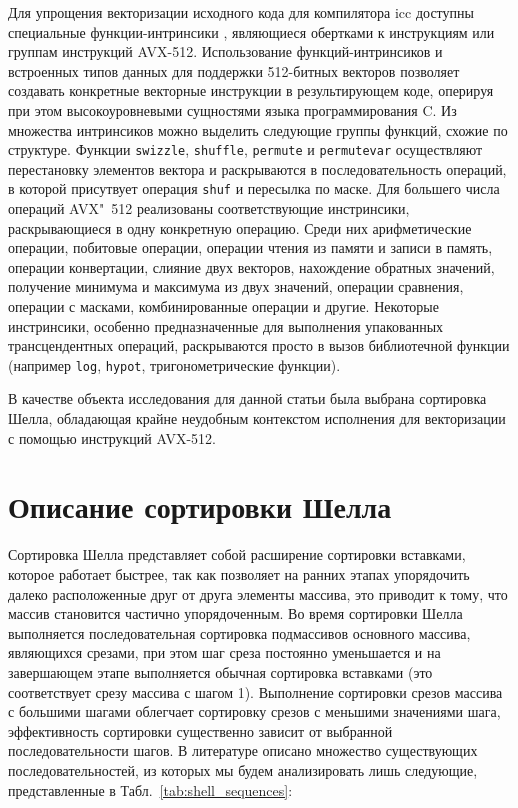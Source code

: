 \documentclass[utf8]{psta}
\begin{document}
Для упрощения векторизации исходного кода для компилятора icc доступны специальные функции-интринсики \cite{compiler_guide, intrinsic_guide}, являющиеся обертками к инструкциям или группам инструкций AVX-512. 
Использование функций-интринсиков и встроенных типов данных для поддержки 512-битных векторов позволяет создавать конкретные векторные инструкции в результирующем коде, оперируя при этом высокоуровневыми сущностями языка программирования C. 
Из множества интринсиков можно выделить следующие группы функций, схожие по структуре. Функции \texttt{swizzle}, \texttt{shuffle}, \texttt{permute} и \texttt{permutevar} осуществляют перестановку элементов вектора и раскрываются в последовательность операций, в которой присутвует операция \texttt{shuf} и пересылка по маске. Для большего числа операций AVX"~512 реализованы соответствующие инстринсики, раскрывающиеся в одну конкретную операцию. 
Среди них арифметические операции, побитовые операции, операции чтения из памяти и записи в память, операции конвертации, слияние двух векторов, нахождение обратных значений, получение минимума и максимума из двух значений, операции сравнения, операции с масками, комбинированные операции и другие. 
Некоторые инстринсики, особенно предназначенные для выполнения упакованных трансцендентных операций, раскрываются просто в вызов библиотечной функции (например \texttt{log}, \texttt{hypot}, тригонометрические функции).

В качестве объекта исследования для данной статьи была выбрана сортировка Шелла, обладающая крайне неудобным контекстом исполнения для векторизации с помощью инструкций AVX-512. 

\section{Описание сортировки Шелла}

Сортировка Шелла \cite{Knuth} представляет собой расширение сортировки вставками, которое работает быстрее, так как позволяет на ранних этапах упорядочить далеко расположенные друг от друга элементы массива, это приводит к тому, что массив становится частично упорядоченным. 
Во время сортировки Шелла выполняется последовательная сортировка подмассивов основного массива, являющихся срезами, при этом шаг среза постоянно уменьшается и на завершающем этапе выполняется обычная сортировка вставками (это соответствует срезу массива с шагом 1).
Выполнение сортировки срезов массива с большими шагами облегчает сортировку срезов с меньшими значениями шага, эффективность сортировки существенно зависит от выбранной последовательности шагов. 
В литературе описано множество существующих последовательностей, из которых мы будем анализировать лишь следующие, представленные в Табл.~\ref{tab:shell_sequences}:
\end{document}
